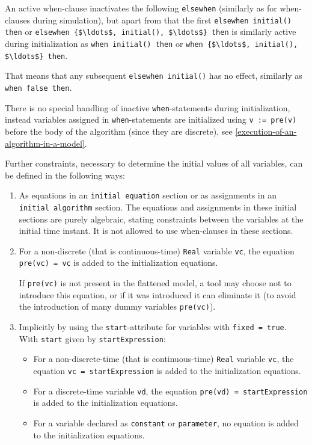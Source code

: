 An active when-clause inactivates the following \lstinline!elsewhen! (similarly as for when-clauses during simulation), but apart from that
the first \lstinline!elsewhen initial() then! or \lstinline!elsewhen {$\ldots$, initial(), $\ldots$} then! is similarly active during initialization as
\lstinline!when initial() then! or \lstinline!when {$\ldots$, initial(), $\ldots$} then!.

\begin{nonnormative}
That means that any subsequent \lstinline!elsewhen initial()! has no effect,
similarly as \lstinline!when false then!.
\end{nonnormative}

\begin{nonnormative}
There is no special handling of inactive \lstinline!when!-statements during initialization, instead variables assigned in \lstinline!when!-statements are initialized using \lstinline!v := pre(v)! before the body of the algorithm (since they are discrete), see \cref{execution-of-an-algorithm-in-a-model}.
\end{nonnormative}

Further constraints, necessary to determine the initial values of all
variables, can be defined in the following ways:
\begin{enumerate}
\item
  As equations in an \lstinline!initial equation! section or as assignments in an \lstinline!initial algorithm! section.
  The equations and assignments in these initial sections are purely algebraic, stating constraints between the variables at the initial time instant.
  It is not allowed to use when-clauses in these sections.
\item
  For a non-discrete (that is continuous-time) \lstinline!Real! variable \lstinline!vc!, the equation \lstinline!pre(vc) = vc! is added to the initialization equations.
  \begin{nonnormative}
  If \lstinline!pre(vc)! is not present in the flattened model, a tool may choose not to introduce this equation, or if it was introduced
  it can eliminate it (to avoid the introduction of many dummy variables \lstinline!pre(vc)!).
  \end{nonnormative}
\item
  Implicitly by using the \lstinline!start!-attribute for variables with \lstinline!fixed = true!.  With \lstinline!start! given by \lstinline!startExpression!:
  \begin{itemize}
  \item
    For a non-discrete-time (that is continuous-time) \lstinline!Real! variable \lstinline!vc!, the equation \lstinline!vc = startExpression! is added to the initialization equations.
  \item
    For a discrete-time variable \lstinline!vd!, the equation \lstinline!pre(vd) = startExpression! is added to the initialization equations.
  \item
    For a variable declared as \lstinline!constant! or \lstinline!parameter!, no equation is added to the initialization equations.
  \end{itemize}
\end{enumerate}

